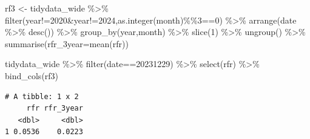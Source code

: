 \documentclass[
  a4paper,
  DIV=11,
  numbers=noendperiod]{scrreprt}
\newenvironment{Shaded}{\begin{snugshade}}{\end{snugshade}}
\newcommand{\AttributeTok}[1]{\textcolor[rgb]{0.40,0.45,0.13}{#1}}
\newcommand{\DecValTok}[1]{\textcolor[rgb]{0.68,0.00,0.00}{#1}}
\newcommand{\FunctionTok}[1]{\textcolor[rgb]{0.28,0.35,0.67}{#1}}
\newcommand{\NormalTok}[1]{\textcolor[rgb]{0.00,0.23,0.31}{#1}}
\newcommand{\OtherTok}[1]{\textcolor[rgb]{0.00,0.23,0.31}{#1}}
\newcommand{\SpecialCharTok}[1]{\textcolor[rgb]{0.37,0.37,0.37}{#1}}
\begin{document}
\begin{Shaded}
\begin{Highlighting}[]
\NormalTok{rf3 }\OtherTok{\textless{}{-}}\NormalTok{ tidydata\_wide }\SpecialCharTok{\%\textgreater{}\%} 
  \FunctionTok{filter}\NormalTok{(year}\SpecialCharTok{!=}\DecValTok{2020}\SpecialCharTok{\&}\NormalTok{year}\SpecialCharTok{!=}\DecValTok{2024}\NormalTok{,}\FunctionTok{as.integer}\NormalTok{(month)}\SpecialCharTok{\%\%}\DecValTok{3}\SpecialCharTok{==}\DecValTok{0}\NormalTok{) }\SpecialCharTok{\%\textgreater{}\%} 
  \FunctionTok{arrange}\NormalTok{(date }\SpecialCharTok{\%\textgreater{}\%} \FunctionTok{desc}\NormalTok{()) }\SpecialCharTok{\%\textgreater{}\%} 
  \FunctionTok{group\_by}\NormalTok{(year,month) }\SpecialCharTok{\%\textgreater{}\%} 
  \FunctionTok{slice}\NormalTok{(}\DecValTok{1}\NormalTok{) }\SpecialCharTok{\%\textgreater{}\%} 
  \FunctionTok{ungroup}\NormalTok{() }\SpecialCharTok{\%\textgreater{}\%} 
  \FunctionTok{summarise}\NormalTok{(}\AttributeTok{rfr\_3year=}\FunctionTok{mean}\NormalTok{(rfr))}

\NormalTok{tidydata\_wide }\SpecialCharTok{\%\textgreater{}\%} \FunctionTok{filter}\NormalTok{(date}\SpecialCharTok{==}\DecValTok{20231229}\NormalTok{) }\SpecialCharTok{\%\textgreater{}\%} \FunctionTok{select}\NormalTok{(rfr) }\SpecialCharTok{\%\textgreater{}\%} \FunctionTok{bind\_cols}\NormalTok{(rf3)}
\end{Highlighting}
\end{Shaded}

\begin{verbatim}
# A tibble: 1 x 2
     rfr rfr_3year
   <dbl>     <dbl>
1 0.0536    0.0223
\end{verbatim}

\begin{Shaded}
\end{Shaded}
\end{document}
